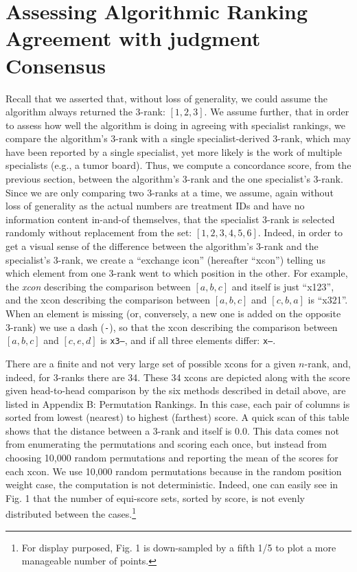 \documentclass{article}
\begin{document}
\section{Assessing Algorithmic Ranking Agreement with judgment Consensus}

Recall that we asserted that, without loss of generality, we could assume the algorithm always returned the 3-rank: $[1,2,3]$. We assume further, that in order to assess how well the algorithm is doing in agreeing with specialist rankings, we compare the algorithm's 3-rank with a single specialist-derived 3-rank, which may have been reported by a single specialist, yet more likely is the work of multiple specialists (e.g., a tumor board). Thus, we compute a concordance score, from the previous section, between the algorithm's 3-rank and the one specialist's 3-rank. Since we are only comparing two 3-ranks at a time, we assume, again without loss of generality as the actual numbers are treatment IDs and have no information content in-and-of themselves, that the specialist 3-rank is selected randomly without replacement from the set: $[1,2,3,4,5,6]$. Indeed, in order to get a visual sense of the difference between the algorithm's 3-rank and the specialist's 3-rank, we create a ``exchange icon'' (hereafter ``xcon'') telling us which element from one 3-rank went to which position in the other. For example, the \emph{xcon} describing the comparison between $[a,b,c]$ and itself is just ``x123'', and the xcon describing the comparison between $[a,b,c]$ and $[c,b,a]$ is ``x321''. When an element is missing (or, conversely, a new one is added on the opposite 3-rank) we use a dash (\texttt{-}), so that the xcon describing the comparison between $[a,b,c]$ and $[c,e,d]$ is \texttt{x3--}, and if all three elements differ: \texttt{x---}. 

There are a finite and not very large set of possible xcons for a given $n$-rank, and, indeed, for 3-ranks there are 34. These 34 xcons are depicted along with the score given head-to-head comparison by the six methods described in detail above, are listed in Appendix B: Permutation Rankings. In this case, each pair of columns is sorted from lowest (nearest) to highest (farthest) score. A quick scan of this table shows that the distance between a 3-rank and itself is 0.0. This data comes not from enumerating the permutations and scoring each once, but instead from choosing 10,000 random permutations and reporting the mean of the scores for each xcon. We use 10,000 random permutations because in the random position weight case, the computation is not deterministic. Indeed, one can easily see in Fig. 1 that the number of equi-score sets, sorted by score, is not evenly distributed between the cases.\footnote{For display purposed, Fig. 1 is down-sampled by a fifth 1/5 to plot a more manageable number of points.}
\end{document}
